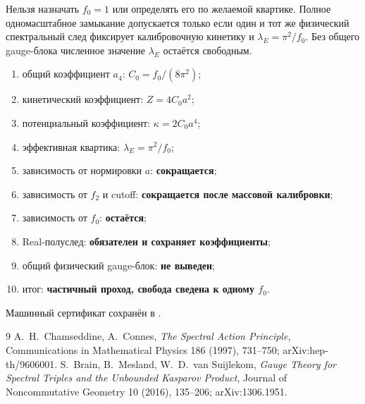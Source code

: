 \begin{nogocriterion}
Нельзя назначать $f_0=1$ или определять его по желаемой квартике. Полное
одномасштабное замыкание допускается только если один и тот же физический
спектральный след фиксирует калибровочную кинетику и
$\lambda_E=\pi^2/f_0$. Без общего gauge-блока численное значение
$\lambda_E$ остаётся свободным.
\end{nogocriterion}

\begin{protocol}
\begin{enumerate}
 \item общий коэффициент $a_4$: \textbf{$C_0=f_0/(8\pi^2)$};
 \item кинетический коэффициент: \textbf{$Z=4C_0a^2$};
 \item потенциальный коэффициент: \textbf{$\kappa=2C_0a^4$};
 \item эффективная квартика: \textbf{$\lambda_E=\pi^2/f_0$};
 \item зависимость от нормировки $a$: \textbf{сокращается};
 \item зависимость от $f_2$ и cutoff: \textbf{сокращается после
 массовой калибровки};
 \item зависимость от $f_0$: \textbf{остаётся};
 \item Real-полуслед: \textbf{обязателен и сохраняет коэффициенты};
 \item общий физический gauge-блок: \textbf{не выведен};
 \item итог: \textbf{частичный проход, свобода сведена к одному $f_0$}.
\end{enumerate}
\end{protocol}

Машинный сертификат сохранён в
.

\begin{thebibliography}{9}
A.~H.~Chamseddine, A.~Connes,
\emph{The Spectral Action Principle},
Communications in Mathematical Physics 186 (1997), 731--750;
arXiv:hep-th/9606001.
S.~Brain, B.~Mesland, W.~D.~van Suijlekom,
\emph{Gauge Theory for Spectral Triples and the Unbounded Kasparov Product},
Journal of Noncommutative Geometry 10 (2016), 135--206;
arXiv:1306.1951.
\end{thebibliography}